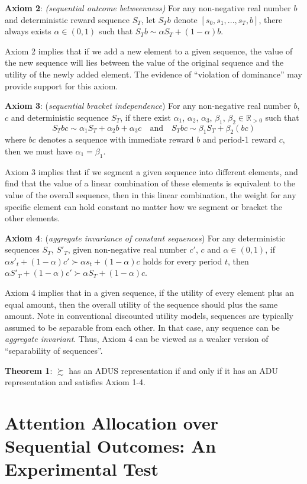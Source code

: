 \documentclass[
  12pt,
]{article}
\begin{document}
\textbf{Axiom 2}: \emph{(sequential outcome betweenness)} For any
non-negative real number \(b\) and deterministic reward sequence
\(S_T\), let \(S_Tb\) denote \([s_0,s_1,...,s_T,b]\), there always
exists \(\alpha\in(0,1)\) such that \(S_Tb\sim \alpha S_T+(1-\alpha)b\).

Axiom 2 implies that if we add a new element to a given sequence, the
value of the new sequence will lies between the value of the original
sequence and the utility of the newly added element. The evidence of
``violation of dominance'' \citep{scholten_better_2014} may provide
support for this axiom.

\textbf{Axiom 3}: (\emph{sequential} \emph{bracket independence}) For
any non-negative real number \(b\), \(c\) and deterministic sequence
\(S_T\), if there exist \(\alpha_1\), \(\alpha_2\), \(\alpha_3\),
\(\beta_1\), \(\beta_2\in \mathbb{R}_{>0}\) such that
\[S_Tbc\sim \alpha_1S_T+\alpha_2b+\alpha_3c \quad\text{and}\quad S_Tbc\sim \beta_1S_T+\beta_2(bc)\]
where \(bc\) denotes a sequence with immediate reward \(b\) and period-1
reward \(c\), then we must have \(\alpha_1=\beta_1\).

Axiom 3 implies that if we segment a given sequence into different
elements, and find that the value of a linear combination of these
elements is equivalent to the value of the overall sequence, then in
this linear combination, the weight for any specific element can hold
constant no matter how we segment or bracket the other elements.

\textbf{Axiom 4}: (\emph{aggregate invariance of constant sequences})
For any deterministic sequences \(S_T\), \(S'_T\), given non-negative
real number \(c'\), \(c\) and \(\alpha\in(0,1)\), if
\(\alpha s'_t+(1-\alpha)c'\succ\alpha s_t+(1-\alpha)c\) holds for every
period \(t\), then
\(\alpha S'_T+(1-\alpha)c'\succ \alpha S_T+(1-\alpha)c\).

Axiom 4 implies that in a given sequence, if the utility of every
element plus an equal amount, then the overall utility of the sequence
should plus the same amount. Note in conventional discounted utility
models, sequences are typically assumed to be separable from each other.
In that case, any sequence can be \emph{aggregate invariant}. Thus,
Axiom 4 can be viewed as a weaker version of ``separability of
sequences''.

\textbf{Theorem 1}: \(\succsim\) has an ADUS representation if and only
if it has an ADU representation and satisfies Axiom 1-4.

\hypertarget{attention-allocation-over-sequential-outcomes-an-experimental-test}{%
\section{\texorpdfstring{Attention Allocation over Sequential Outcomes:
An Experimental Test
\label{3}}{Attention Allocation over Sequential Outcomes: An Experimental Test }}\label{attention-allocation-over-sequential-outcomes-an-experimental-test}}
\end{document}
